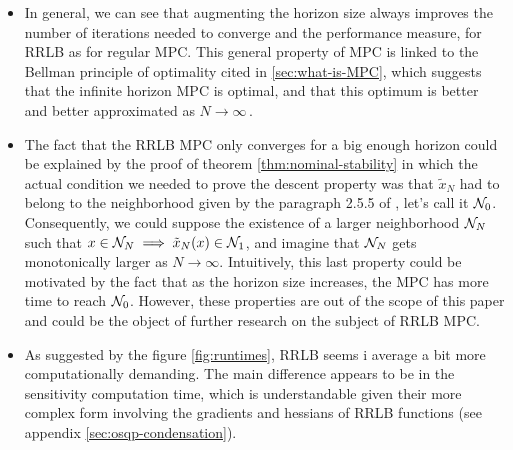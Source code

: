 \documentclass[12pt]{article}
\begin{document}
\begin{itemize}[label=\textbullet]
	\item In general, we can see that augmenting the horizon size always improves the number of iterations needed to converge and the performance measure, for RRLB as for regular MPC.
	This general property of MPC is linked to the Bellman principle of optimality cited in \ref{sec:what-is-MPC}, which suggests that the infinite horizon MPC is optimal, and that this optimum is better and better approximated as $N\to\infty$\,.

	\item The fact that the RRLB MPC only converges for a big enough horizon could be explained by the proof of theorem \ref{thm:nominal-stability} in which the actual condition we needed to prove the descent property was that $\tilde{x}_N$ had to belong to the neighborhood given by the paragraph 2.5.5 of \cite{MPC-book}, let's call it $\mathcal{N}_0$.
	Consequently, we could suppose the existence of a larger neighborhood $\mathcal{N}_N$ such that $x\in\mathcal{N}_N\implies \tilde{x}_N(x)\in\mathcal{N}_1$, and imagine that $\mathcal{N}_N$ gets monotonically larger as $N\to\infty$.
	Intuitively, this last property could be motivated by the fact that as the horizon size increases, the MPC has more time to reach $\mathcal{N}_0$.
	However, these properties are out of the scope of this paper and could be the object of further research on the subject of RRLB MPC.

	\item As suggested by the figure \ref{fig:runtimes}, RRLB seems i average a bit more computationally demanding.
	The main difference appears to be in the sensitivity computation time, which is understandable given their more complex form involving the gradients and hessians of RRLB functions (see appendix \ref{sec:osqp-condensation}).


\end{itemize}
\end{document}
